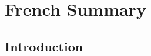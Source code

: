\chapter{French Summary}
\label{chap:french}
\vspace{2ex}\vfill
\minitoc
\begin{otherlanguage}{french}
 
\section{Introduction}


\end{otherlanguage}
